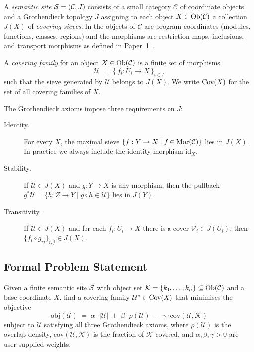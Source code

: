 \documentclass[11pt]{article}
\begin{document}
A \emph{semantic site} $\mathcal{S} = (\mathcal{C}, J)$ consists of a small
category $\mathcal{C}$ of coordinate objects and a Grothendieck
topology $J$ assigning to each object $X \in \mathrm{Ob}(\mathcal{C})$ a
collection $J(X)$ of \emph{covering sieves}.
In \JuGeo{} the objects of $\mathcal{C}$ are program coordinates
(modules, functions, classes, regions) and the morphisms are
restriction maps, inclusions, and transport morphisms as defined in
Paper~1~\cite{paper01}.

\begin{definition}
A \emph{covering family} for an object $X \in \mathrm{Ob}(\mathcal{C})$ is a
finite set of morphisms
\[
  \mathcal{U} \;=\; \bigl\{\, f_i : U_i \longrightarrow X \,\bigr\}_{i \in I}
\]
such that the sieve generated by $\mathcal{U}$ belongs to $J(X)$.
We write $\mathrm{Cov}(X)$ for the set of all covering families of $X$.
\end{definition}

The Grothendieck axioms impose three requirements on $J$:
\begin{description}
  \item[Identity.]  For every $X$, the maximal sieve
    $\{f : Y \to X \mid f \in \mathrm{Mor}(\mathcal{C})\}$ lies in $J(X)$.
    In practice we always include the identity morphism $\mathrm{id}_X$.
  \item[Stability.]  If $\mathcal{U} \in J(X)$ and
    $g : Y \to X$ is any morphism, then the pullback
    $g^*\mathcal{U} = \{h : Z \to Y \mid g \circ h \in \mathcal{U}\}$
    lies in $J(Y)$.
  \item[Transitivity.]  If $\mathcal{U} \in J(X)$ and for each
    $f_i : U_i \to X$ there is a cover
    $\mathcal{V}_i \in J(U_i)$, then
    $\{f_i \circ g_{ij}\}_{i,j} \in J(X)$.
\end{description}

\subsection{Formal Problem Statement}

\begin{definition}
Given a finite semantic site $\mathcal{S}$ with object set
$\mathcal{K} = \{k_1,\dots,k_n\} \subseteq \mathrm{Ob}(\mathcal{C})$ and a
base coordinate $X$, find a covering family
$\mathcal{U}^* \in \mathrm{Cov}(X)$ that minimises the objective
\[
  \mathrm{obj}(\mathcal{U})
  \;=\;
  \alpha \cdot |\mathcal{U}|
  \;+\;
  \beta \cdot \rho(\mathcal{U})
  \;-\;
  \gamma \cdot \mathrm{cov}(\mathcal{U}, \mathcal{K})
\]
subject to $\mathcal{U}$ satisfying all three Grothendieck axioms,
where $\rho(\mathcal{U})$ is the overlap density,
$\mathrm{cov}(\mathcal{U}, \mathcal{K})$ is the fraction of
$\mathcal{K}$ covered, and $\alpha, \beta, \gamma > 0$ are
user-supplied weights.
\end{definition}
\end{document}
